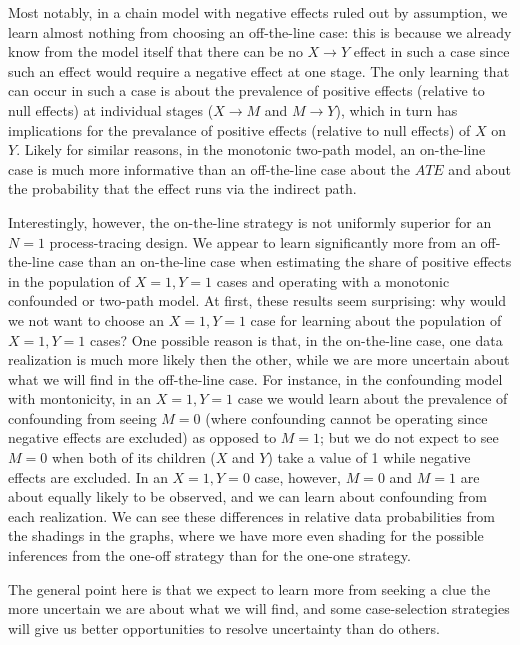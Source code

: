 \documentclass[
  12pt,
]{book}
\begin{document}
Most notably, in a chain model with negative effects ruled out by assumption, we learn almost nothing from choosing an off-the-line case: this is because we already know from the model itself that there can be no \(X \rightarrow Y\) effect in such a case since such an effect would require a negative effect at one stage. The only learning that can occur in such a case is about the prevalence of positive effects (relative to null effects) at individual stages (\(X \rightarrow M\) and \(M \rightarrow Y\)), which in turn has implications for the prevalance of positive effects (relative to null effects) of \(X\) on \(Y\). Likely for similar reasons, in the monotonic two-path model, an on-the-line case is much more informative than an off-the-line case about the \(ATE\) and about the probability that the effect runs via the indirect path.

Interestingly, however, the on-the-line strategy is not uniformly superior for an \(N=1\) process-tracing design. We appear to learn significantly more from an off-the-line case than an on-the-line case when estimating the share of positive effects in the population of \(X=1, Y=1\) cases and operating with a monotonic confounded or two-path model. At first, these results seem surprising: why would we not want to choose an \(X=1, Y=1\) case for learning about the population of \(X=1, Y=1\) cases? One possible reason is that, in the on-the-line case, one data realization is much more likely then the other, while we are more uncertain about what we will find in the off-the-line case. For instance, in the confounding model with montonicity, in an \(X=1, Y=1\) case we would learn about the prevalence of confounding from seeing \(M=0\) (where confounding cannot be operating since negative effects are excluded) as opposed to \(M=1\); but we do not expect to see \(M=0\) when both of its children (\(X\) and \(Y\)) take a value of 1 while negative effects are excluded. In an \(X=1, Y=0\) case, however, \(M=0\) and \(M=1\) are about equally likely to be observed, and we can learn about confounding from each realization. We can see these differences in relative data probabilities from the shadings in the graphs, where we have more even shading for the possible inferences from the one-off strategy than for the one-one strategy.

The general point here is that we expect to learn more from seeking a clue the more uncertain we are about what we will find, and some case-selection strategies will give us better opportunities to resolve uncertainty than do others.
\end{document}
